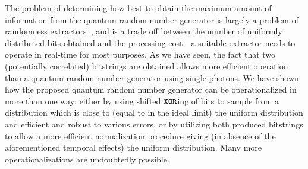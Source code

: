 \documentclass[%
 preprint,
 showpacs,
 showkeys,
 preprintnumbers,
  amsmath,amssymb,
  aps,
 pra,
  longbibliography,
  floatfix,
 ]{revtex4-1}
\theoremstyle{definition}
\begin{document}
The problem of determining how best to obtain the maximum amount of information from the quantum random number generator is largely a problem of randomness extractors~\cite{Gabizon:2010uq}, and is a trade off between the number of uniformly distributed bits obtained and the processing cost---a suitable extractor needs to operate in real-time for most purposes. As we have seen, the fact that two (potentially correlated) bitstrings are obtained allows more efficient operation than a quantum random number generator using single-photons. We have shown how the proposed quantum random number generator can be operationalized in more than one way: either by using shifted ${\tt XOR}$ing of bits to sample from a distribution which is close to (equal to in the ideal limit) the uniform distribution and efficient and robust to various errors, or by utilizing both produced bitstrings to allow a more efficient normalization procedure giving (in absence of the aforementioned temporal effects) the uniform distribution. Many more operationalizations are undoubtedly possible.



\end{document}
